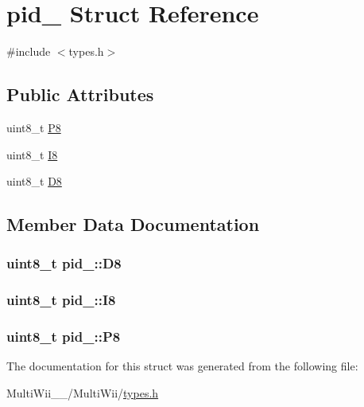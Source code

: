 \hypertarget{structpid__}{\section{pid\-\_\- Struct Reference}
\label{structpid__}
}


{\ttfamily \#include $<$types.\-h$>$}

\subsection*{Public Attributes}
\begin{DoxyCompactItemize}
\item 
uint8\-\_\-t \hyperlink{structpid___ae0911f3b82c377d9a4994dbc834e1ee4}{P8}
\item 
uint8\-\_\-t \hyperlink{structpid___a25caf1096a0e8531ce94eafd842a14b6}{I8}
\item 
uint8\-\_\-t \hyperlink{structpid___a2cc4f84c854e2299c74b6eaea0223a69}{D8}
\end{DoxyCompactItemize}


\subsection{Member Data Documentation}
\hypertarget{structpid___a2cc4f84c854e2299c74b6eaea0223a69}{
\subsubsection[{D8}]{\setlength{\rightskip}{0pt plus 5cm}uint8\-\_\-t pid\-\_\-\-::\-D8}}\label{structpid___a2cc4f84c854e2299c74b6eaea0223a69}
\hypertarget{structpid___a25caf1096a0e8531ce94eafd842a14b6}{
\subsubsection[{I8}]{\setlength{\rightskip}{0pt plus 5cm}uint8\-\_\-t pid\-\_\-\-::\-I8}}\label{structpid___a25caf1096a0e8531ce94eafd842a14b6}
\hypertarget{structpid___ae0911f3b82c377d9a4994dbc834e1ee4}{
\subsubsection[{P8}]{\setlength{\rightskip}{0pt plus 5cm}uint8\-\_\-t pid\-\_\-\-::\-P8}}\label{structpid___ae0911f3b82c377d9a4994dbc834e1ee4}


The documentation for this struct was generated from the following file\-:\begin{DoxyCompactItemize}
\item 
Multi\-Wii\-\_\-\_/\-Multi\-Wii/\hyperlink{MultiWii__2__4_2MultiWii_2types_8h}{types.\-h}\end{DoxyCompactItemize}
